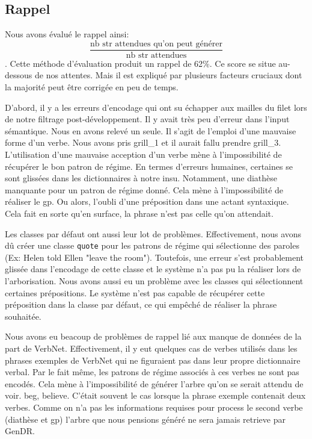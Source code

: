 \subsection{Rappel}

Nous avons évalué le rappel ainsi:\[\frac{\text{nb str attendues qu'on peut générer}}{\text{nb str attendues}}\]. Cette méthode d'évaluation produit un rappel de 62\%. Ce score se situe au-dessous de nos attentes. Mais il est expliqué par plusieurs facteurs cruciaux dont la majorité peut être corrigée en peu de temps. 

D'abord, il y a les erreurs d'encodage qui ont su échapper aux mailles du filet lors de notre filtrage post-développement. Il y avait très peu d'erreur dans l'input sémantique. Nous en avons relevé un seule. Il s'agit de l'emploi d'une mauvaise forme d'un verbe. Nous avons pris grill\_1 et il aurait fallu prendre grill\_3. L'utilisation d'une mauvaise acception d'un verbe mène à l'impossibilité de récupérer le bon patron de régime. En termes d'erreurs humaines, certaines se sont glissées dans les dictionnaires à notre insu. Notamment, une diathèse manquante pour un patron de régime donné. Cela mène à l'impossibilité de réaliser le gp. Ou alors, l'oubli d'une préposition dans une actant syntaxique. Cela fait en sorte qu'en surface, la phrase n'est pas celle qu'on attendait.

Les classes par défaut ont aussi leur lot de problèmes. Effectivement, nous avons dû créer une classe \texttt{quote} pour les patrons de régime qui sélectionne des paroles (Ex: Helen told Ellen "leave the room"). Toutefois, une erreur s'est probablement glissée dans l'encodage de cette classe et le système n'a pas pu la réaliser lors de l'arborisation. Nous avons aussi eu un problème avec les classes qui sélectionnent certaines prépositions. Le système n'est pas capable de récupérer cette préposition dans la classe par défaut, ce qui empêché de réaliser la phrase souhaitée. 

Nous avons eu beacoup de problèmes de rappel lié aux manque de données de la part de VerbNet. Effectivement, il y eut quelques cas de verbes utilisés dans les phrases exemples de VerbNet qui ne figuraient pas dans leur propre dictionnaire verbal. Par le fait même, les patrons de régime associés à ces verbes ne sont pas encodés. Cela mène à l'impossibilité de générer l'arbre qu'on se serait attendu de voir. beg, believe. C'était souvent le cas lorsque la phrase exemple contenait deux verbes. Comme on n'a pas les informations requises pour process le second verbe (diathèse et gp) l'arbre que nous pensions généré ne sera jamais retrieve par GenDR. 

